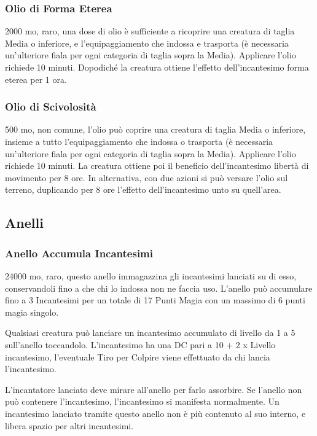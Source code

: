 \begin{multicols}{2}
	\subsubsection*{Olio di Forma Eterea}
	2000 mo, raro, una dose di olio è sufficiente a ricoprire una creatura di taglia Media o inferiore, e l'equipaggiamento che indossa e trasporta (è necessaria un'ulteriore fiala per ogni categoria di taglia sopra la Media). Applicare l'olio richiede 10 minuti. Dopodiché la creatura ottiene l'effetto dell'incantesimo forma eterea per 1 ora.

	\subsubsection*{Olio di Scivolosità}
	500 mo, non comune, l'olio può coprire una creatura di taglia Media o inferiore, insieme a tutto l'equipaggiamento che indossa o trasporta (è necessaria un'ulteriore fiala per ogni categoria di taglia sopra la Media). Applicare l'olio richiede 10 minuti. La creatura ottiene poi il beneficio dell'incantesimo libertà di movimento per 8 ore. In alternativa, con due azioni si può versare l'olio sul terreno, duplicando per 8 ore l'effetto dell'incantesimo unto su quell'area.


	\subsection{Anelli}

	\subsubsection*{Anello Accumula Incantesimi}
	24000 mo, raro, questo anello immagazzina gli incantesimi lanciati su di esso, conservandoli fino a che chi lo indossa non ne faccia uso. L'anello può accumulare fino a 3 Incantesimi per un totale di 17 Punti Magia con un massimo di 6 punti magia singolo.

	Qualsiasi creatura può lanciare un incantesimo accumulato di livello da 1 a 5 sull'anello toccandolo. L'incantesimo ha una DC pari a 10 + 2 x Livello incantesimo, l'eventuale Tiro per Colpire viene effettuato da chi lancia l'incantesimo.

	L'incantatore lanciato deve mirare all'anello per farlo assorbire. Se l'anello non può contenere l'incantesimo, l'incantesimo si manifesta normalmente. Un incantesimo lanciato tramite questo anello non è più contenuto al suo interno, e libera spazio per altri incantesimi.


\end{multicols}
